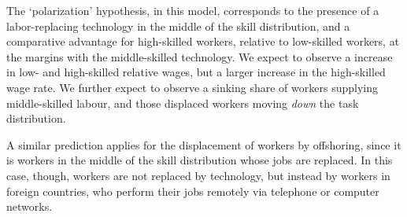 The `polarization' hypothesis, in this model, corresponds to the presence of a labor-replacing technology in the middle of the skill distribution, and a comparative advantage for high-skilled workers, relative to low-skilled workers, at the margins with the middle-skilled technology. We expect to observe a increase in low- and high-skilled relative wages, but a larger increase in the high-skilled wage rate. We further expect to observe a sinking share of workers supplying middle-skilled labour, and those displaced workers moving {\em down} the task distribution.

A similar prediction applies for the displacement of workers by offshoring, since it is workers in the middle of the skill distribution whose jobs are replaced. In this case, though, workers are not replaced by technology, but instead by workers in foreign countries, who perform their jobs remotely via telephone or computer networks.


